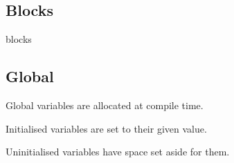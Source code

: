
\subsection{Blocks}

{} blocks

\subsection{Global}

Global variables are allocated at compile time.

Initialised variables are set to their given value.

Uninitialised variables have space set aside for them.

